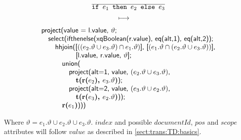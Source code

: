 \begin{equation}
\begin{array}{c}
\frac{}{\displaystyle \mbox{\texttt{if }}e_1\mbox{\texttt{ then }}e_2\mbox{\texttt{ else }}e_3} \\
\longmapsto \begin{array}{c}\mbox{\tiny } \\ \mbox{\tiny } \end{array} \\
\begin{array}{l}
\mbox{\textsf{project(value = l.value, }}\vartheta\mbox{\textsf{;}} \\ \quad
\mbox{\textsf{select(ifthenelse(xqBoolean(r.value), eq(alt,1), eq(alt,2));}} \\ \quad \quad
\mbox{\textsf{hhjoin([}}((e_2.\vartheta \cup e_3.\vartheta)\cap e_1.\vartheta)\mbox{\textsf{],
[}}(e_1.\vartheta\cap (e_2.\vartheta\cup e_3.\vartheta))
\mbox{\textsf{],}} 
\\  \quad \quad \quad \quad \quad\mbox{\textsf{[l.value, r.value, }}\vartheta\mbox{\textsf{];}}\\\quad\quad\quad
\mbox{\textsf{union(}} \\ \quad\quad\quad\quad
\mbox{\textsf{project(alt=1, value, }}(e_2.\vartheta \cup e_3.\vartheta)\mbox{\textsf{,}}\\\quad\quad\quad\quad\quad
\mbox{\textbf{t(r(}}e_2\mbox{\textbf{), }}e_3.\vartheta\mbox{\textbf{)}\textsf{);}} \\ \quad\quad\quad\quad
\mbox{\textsf{project(alt=2, value, }}(e_3.\vartheta\cup e_2.\vartheta)\mbox{\textsf{,}}\\\quad\quad\quad\quad\quad
\mbox{\textbf{t(r(}}e_3\mbox{\textbf{), }}e_2.\vartheta\mbox{\textbf{)}\textsf{));}}\\\quad\quad\quad
\mbox{\textbf{r(}}e_1\mbox{\textbf{)}\textsf{)))}}
\end{array}
\end{array}
\label{rule:trans:TD:conditional}
\end{equation}

Where $\vartheta = e_1.\vartheta \cup e_2.\vartheta \cup e_3.\vartheta$. $index$ and possible $documentId$, $pos$
and $scope$ attributes will follow $value$ as described in \ref{sect:trans:TD:basics}.

